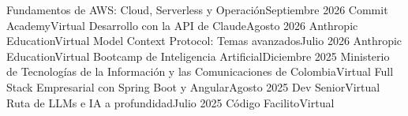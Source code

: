 \resumeSubHeadingListStart
    \resumeSubheading
        {Fundamentos de AWS: Cloud, Serverless y Operación}{Septiembre 2026}
        {Commit Academy}{Virtual}
    \resumeSubheading
        {Desarrollo con la API de Claude}{Agosto 2026}
        {Anthropic Education}{Virtual}
    \resumeSubheading
        {Model Context Protocol: Temas avanzados}{Julio 2026}
        {Anthropic Education}{Virtual}
    \resumeSubheading
        {Bootcamp de Inteligencia Artificial}{Diciembre 2025}
        {Ministerio de Tecnologías de la Información y las Comunicaciones de Colombia}{Virtual}
    \resumeSubheading
        {Full Stack Empresarial con Spring Boot y Angular}{Agosto 2025}
        {Dev Senior}{Virtual}
    \resumeSubheading
        {Ruta de LLMs e IA a profundidad}{Julio 2025}
        {Código Facilito}{Virtual}
\resumeSubHeadingListEnd
